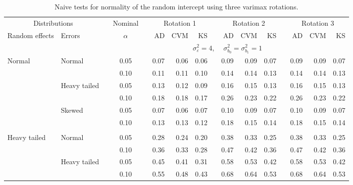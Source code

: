 \documentclass[11pt]{article} %
\begin{document}
\begin{table}[ht]
\begin{scriptsize}
\begin{center}
\begin{tabular}{ll p{.1cm} c p{.1cm} rrr p{.1cm} rrr p{.1cm} rrr}
   \hline
\end{tabular}
\end{center}
\end{scriptsize}
\end{table}


\begin{table}[ht]
\caption{Naive tests for normality of the random intercept using three varimax rotations.}
\begin{scriptsize}
\begin{center}
\begin{tabular}{ll p{.1cm} c p{.1cm} rrr p{.1cm} rrr p{.1cm} rrr}
  \hline
  \multicolumn{2}{c}{Distributions}& & Nominal & &  \multicolumn{3}{c}{Rotation 1} & & \multicolumn{3}{c}{Rotation 2} & & \multicolumn{3}{c}{Rotation 3}\\ \cline{1-2} \cline{6-8} \cline{10-12} \cline{14-16}
  Random effects & Errors & & $\alpha$ & & AD & CVM & KS & & AD & CVM & KS & & AD & CVM & KS \\ 
   \hline
& && && \multicolumn{9}{c}{$\sigma_{\varepsilon}^2 = 4$, \ \ $\sigma_{b_0}^2 = \sigma_{b_1}^2 = 1$} \\ \cline{6-16}
Normal       & Normal       && 0.05 &&  0.07 & 0.06 & 0.06 && 0.09 & 0.09 & 0.07 && 0.09 & 0.09 & 0.07 \\ 
             &              && 0.10 &&  0.11 & 0.11 & 0.10 && 0.14 & 0.14 & 0.13 && 0.14 & 0.14 & 0.13 \\ 
             & Heavy tailed && 0.05 &&  0.13 & 0.12 & 0.09 && 0.16 & 0.15 & 0.13 && 0.16 & 0.15 & 0.13 \\ 
             &              && 0.10 &&  0.18 & 0.18 & 0.17 && 0.26 & 0.23 & 0.22 && 0.26 & 0.23 & 0.22 \\ 
             & Skewed       && 0.05 &&  0.07 & 0.06 & 0.07 && 0.10 & 0.09 & 0.07 && 0.10 & 0.09 & 0.07 \\ 
             &              && 0.10 &&  0.13 & 0.13 & 0.12 && 0.18 & 0.15 & 0.14 && 0.18 & 0.15 & 0.14 \\
             &&&&&&&&&&&&&&&\\ 
Heavy tailed & Normal       && 0.05 &&  0.28 & 0.24 & 0.20 && 0.38 & 0.33 & 0.25 && 0.38 & 0.33 & 0.25 \\ 
             &              && 0.10 &&  0.36 & 0.33 & 0.28 && 0.47 & 0.42 & 0.36 && 0.47 & 0.42 & 0.36 \\ 
             & Heavy tailed && 0.05 &&  0.45 & 0.41 & 0.31 && 0.58 & 0.53 & 0.42 && 0.58 & 0.53 & 0.42 \\ 
             &              && 0.10 &&  0.55 & 0.48 & 0.43 && 0.68 & 0.64 & 0.53 && 0.68 & 0.64 & 0.53 \\ 

\end{tabular}
\end{center}
\end{scriptsize}
\end{table}
\end{document}
